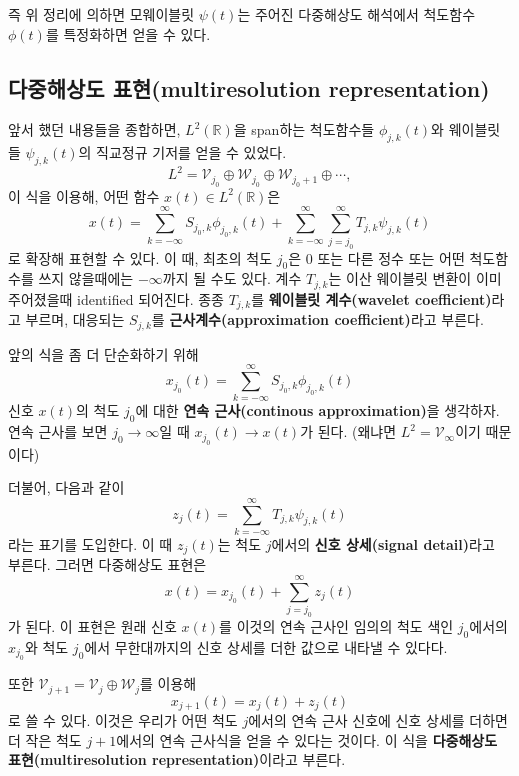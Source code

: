 \documentclass[b5paper,]{scrbook}
\theoremstyle{plain}
\theoremstyle{definition}
\numberwithin{equation}{section}
\begin{document}
즉 위 정리에 의하면 모웨이블릿 \(\psi(t)\)는 주어진 다중해상도 해석에서 척도함수 \(\phi(t)\)를 특정화하면 얻을 수 있다.

\hypertarget{-multiresolution-representation}{%
\subsection{다중해상도 표현(multiresolution representation)}\label{-multiresolution-representation}}

앞서 했던 내용들을 종합하면, \(L^{2}(\mathbb{R})\)을 span하는 척도함수들 \(\phi_{j,k}(t)\)와 웨이블릿들 \(\psi_{j,k}(t)\)의 직교정규 기저를 얻을 수 있었다.
\[L^{2}=\mathcal{V}_{j_{0}}\oplus\mathcal{W}_{j_{0}}\oplus\mathcal{W}_{j_{0}+1}\oplus\cdots,\]
이 식을 이용해, 어떤 함수 \(x(t)\in L^{2}(\mathbb{R})\)은
\[x(t)=\sum_{k=-\infty}^{\infty}S_{j_{0},k}\phi_{j_{0},k}(t)+\sum_{k=-\infty}^{\infty}\sum_{j=j_{0}}^{\infty}T_{j,k}\psi_{j,k}(t)\]
로 확장해 표현할 수 있다. 이 때, 최초의 척도 \(j_{0}\)은 0 또는 다른 정수 또는 어떤 척도함수를 쓰지 않을때에는 \(-\infty\)까지 될 수도 있다. 계수 \(T_{j,k}\)는 이산 웨이블릿 변환이 이미 주어졌을때 identified 되어진다. 종종 \(T_{j,k}\)를 \textbf{웨이블릿 계수(wavelet coefficient)}라고 부르며, 대응되는 \(S_{j,k}\)를 \textbf{근사계수(approximation coefficient)}라고 부른다.

앞의 식을 좀 더 단순화하기 위해
\[x_{j_{0}}(t)=\sum_{k=-\infty}^{\infty}S_{j_{0},k}\phi_{j_{0},k}(t)\]
신호 \(x(t)\)의 척도 \(j_{0}\)에 대한 \textbf{연속 근사(continous approximation)}을 생각하자. 연속 근사를 보면 \(j_{0}\rightarrow \infty\)일 때 \(x_{j_{0}}(t)\rightarrow x(t)\)가 된다. (왜냐면 \(L^{2}=\mathcal{V}_{\infty}\)이기 때문이다)

더불어, 다음과 같이
\[z_{j}(t)=\sum_{k=-\infty}^{\infty}T_{j,k}\psi_{j,k}(t)\]
라는 표기를 도입한다. 이 때 \(z_{j}(t)\)는 척도 \(j\)에서의 \textbf{신호 상세(signal detail)}라고 부른다. 그러면 다중해상도 표현은
\[x(t)=x_{j_{0}}(t)+\sum_{j=j_{0}}^{\infty}z_{j}(t)\]
가 된다. 이 표현은 원래 신호 \(x(t)\)를 이것의 연속 근사인 임의의 척도 색인 \(j_{0}\)에서의 \(x_{j_{0}}\)와 척도 \(j_{0}\)에서 무한대까지의 신호 상세를 더한 값으로 내타낼 수 있다다.

또한 \(\mathcal{V}_{j+1}=\mathcal{V}_{j}\oplus\mathcal{W}_{j}\)를 이용해
\[x_{j+1}(t)=x_{j}(t)+z_{j}(t)\]
로 쓸 수 있다. 이것은 우리가 어떤 척도 \(j\)에서의 연속 근사 신호에 신호 상세를 더하면 더 작은 척도 \(j+1\)에서의 연속 근사식을 얻을 수 있다는 것이다. 이 식을 \textbf{다중해상도 표현(multiresolution representation)}이라고 부른다.
\end{document}
